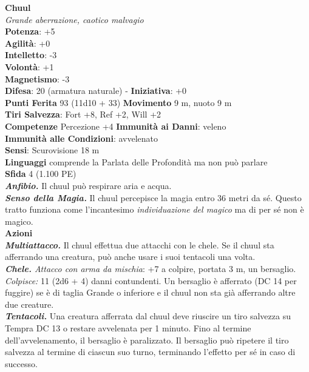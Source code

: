 \begin{multicols}{2}
\medskip\textbf{Chuul}\\
\emph{Grande aberrazione, caotico malvagio}\\
\textbf{Potenza}: +5\\
\textbf{Agilità}: +0\\
\textbf{Intelletto}: -3\\
\textbf{Volontà}: +1\\
\textbf{Magnetismo}: -3\\
\textbf{Difesa}: 20 (armatura naturale) - \textbf{Iniziativa}: +0\\
\textbf{Punti Ferita} 93 (11d10 + 33)
\textbf{Movimento} 9 m, nuoto 9 m\\
\textbf{Tiri Salvezza}: Fort +8, Ref +2, Will +2\\
\textbf{Competenze} Percezione +4 \textbf{Immunità ai Danni}: veleno\\
\textbf{Immunità alle Condizioni}: avvelenato\\
\textbf{Sensi}: Scurovisione 18 m\\
\textbf{Linguaggi} comprende la Parlata delle Profondità ma non può parlare\\
\textbf{Sfida} 4 (1.100 PE)\smallskip\\
\emph{\textbf{Anfibio.}} Il chuul può respirare aria e acqua.\\
\emph{\textbf{Senso della Magia.}} Il chuul percepisce la magia entro 36 metri da sé. Questo tratto funziona come l'incantesimo \emph{individuazione} \emph{del magico} ma di per sé non è magico.\\
\smallskip\textbf{Azioni}\\
\emph{\textbf{Multiattacco.}} Il chuul effettua due attacchi con le chele. Se il chuul sta afferrando una creatura, può anche usare i suoi tentacoli una volta.\\
\emph{\textbf{Chele.} Attacco con arma da mischia}: +7 a colpire, portata 3 m, un bersaglio.\\
\emph{Colpisce:} 11 (2d6 + 4) danni contundenti. Un bersaglio è afferrato (DC 14 per fuggire) se è di taglia Grande o inferiore e il chuul non sta già afferrando altre due creature.\\
\emph{\textbf{Tentacoli.}} Una creatura afferrata dal chuul deve riuscire un tiro salvezza su Tempra DC 13 o restare avvelenata per 1 minuto. Fino al termine dell'avvelenamento, il bersaglio è paralizzato. Il bersaglio può ripetere il tiro salvezza al termine di ciascun suo turno, terminando l'effetto per sé in caso di successo.\\

\end{multicols}
